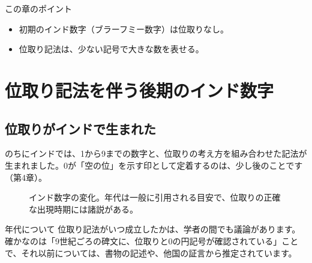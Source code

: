 \documentclass[a4paper,11pt,openany]{ltjsbook}
\begin{document}
\begin{pointbox}{この章のポイント}
\begin{itemize}[leftmargin=1.5em]
\item 初期のインド数字（ブラーフミー数字）は位取りなし。
\item 位取り記法は、少ない記号で大きな数を表せる。
\end{itemize}
\end{pointbox}

\chapter{位取り記法を伴う後期のインド数字}

\section{位取りがインドで生まれた}

のちにインドでは、1から9までの数字と、位取りの考え方を組み合わせた記法が生まれました。0が「空の位」を示す印として定着するのは、少し後のことです（第4章）。

\begin{figure}[htbp]
\centering
{}
\caption{インド数字の変化。年代は一般に引用される目安で、位取りの正確な出現時期には諸説がある。}
\end{figure}

\begin{notebox}{年代について}
位取り記法がいつ成立したかは、学者の間でも議論があります。確かなのは「9世紀ごろの碑文に、位取りと0の円記号が確認されている」ことで、それ以前については、書物の記述や、他国の証言から推定されています。
\end{notebox}
\end{document}
